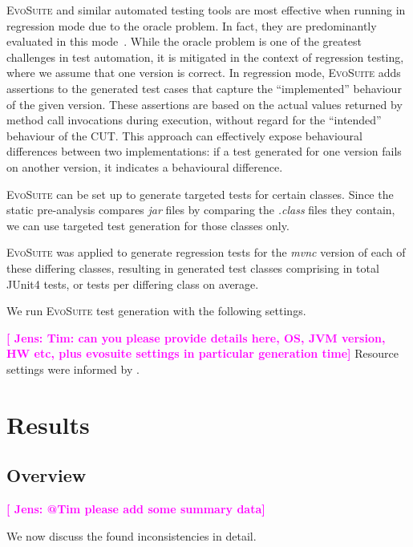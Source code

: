 \documentclass[conference]{IEEEtran}
\makeatletter
\newcommand{\evosuite}{\textsc{EvoSuite}\@\xspace}
\newcommand{\jens}[1]{\textbf{\textcolor{magenta}{[ \ding{46}Jens: #1]}}}
\newcommand{\inputgen}[1]{\unskip}
\makeatother
\begin{document}
\evosuite and similar automated testing tools are most effective when running in regression mode due to the oracle problem. In fact, they are predominantly evaluated in this mode~\cite{jahangirova2023sbft,shamshiri2015automatically}. While the oracle problem is one of the greatest challenges in test automation, it is mitigated in the context of regression testing, where we assume that one version is correct. In regression mode, \evosuite adds assertions to the generated test cases that capture the ``implemented'' behaviour of the given version. These assertions are based on the actual values returned by method call invocations during execution, without regard for the ``intended'' behaviour of the CUT. This approach can effectively expose behavioural differences between two implementations: if a test generated for one version fails on another version, it indicates a behavioural difference.

\evosuite can be set up to generate targeted tests for certain classes. Since the static pre-analysis compares \textit{jar} files by comparing the \textit{.class} files they contain, we can use targeted test generation for those classes only.   

\evosuite was applied to generate regression tests for the \textit{mvnc} version of each of these \inputgen{num-class-pairs-after-invokevirtual-invokeinterface} differing classes, resulting in \inputgen{num-classes-with-generated-tests} generated test classes comprising in total \inputgen{num-generated-tests} JUnit4 tests, or \inputgen{avg-tests-per-class} tests per differing class on average.

We run \evosuite test generation with the following settings. 

\jens{Tim: can you please provide details here, OS, JVM version, HW etc, plus evosuite settings in particular generation time}
Resource settings were informed by \cite{jahangirova2023sbft}. 


\section{Results}
\label{sec:results}

\subsection{Overview}

\jens{@Tim please add some summary data}

We now discuss the found inconsistencies in detail.
\end{document}
